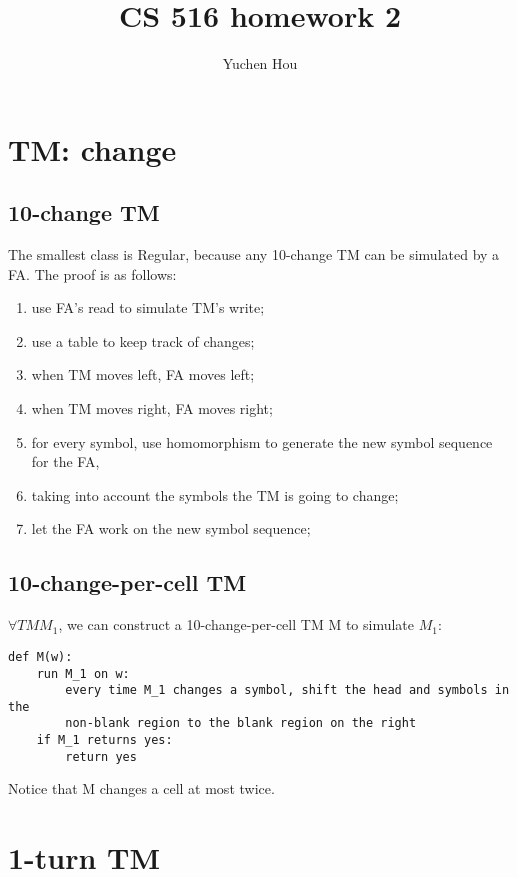 \documentclass{article}
\begin{document}
\lstset{language=python, tabsize=4}
\title{CS 516 homework 2}
\author{Yuchen Hou}
\maketitle

\section{TM: change}

\subsection{10-change TM}

The smallest class is Regular, because any 10-change TM can be simulated by a FA. The proof is as follows:
\begin{enumerate}
	\item use FA's read to simulate TM's write;
	\item use a table to keep track of changes;
	\item when TM moves left, FA moves left;
	\item when TM moves right, FA moves right;
	\item for every symbol, use homomorphism to generate the new symbol sequence for the FA, \item taking into account the symbols the TM is going to change;
	\item let the FA work on the new symbol sequence;
\end{enumerate}

\subsection{10-change-per-cell TM}

$ \forall TM M_1 $, we can construct a 10-change-per-cell TM M to simulate $ M_1 $:
\begin{lstlisting}
def M(w):
	run M_1 on w:
		every time M_1 changes a symbol, shift the head and symbols in the
		non-blank region to the blank region on the right
	if M_1 returns yes:
		return yes
\end{lstlisting}
Notice that M changes a cell at most twice.

\section{1-turn TM}
\end{document}
